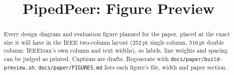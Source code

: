 \documentclass[conference]{IEEEtran}
\begin{document}
\title{PipedPeer: Figure Preview}
\author{
}
\maketitle

\begin{abstract}
Every design diagram and evaluation figure planned for the paper, placed at the
exact size it will have in the IEEE two-column layout (252\,pt single column,
516\,pt double column: IEEEtran's own column and text widths), so labels, line weights and spacing can be judged as
printed. Captions are drafts. Regenerate with
\texttt{docs/paper/build-preview.sh}; \texttt{docs/paper/FIGURES.md} lists each
figure's file, width and paper section.
\end{abstract}


\end{document}
